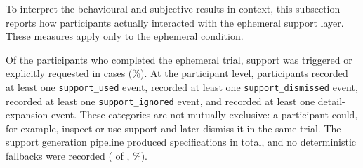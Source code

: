 %
%

To interpret the behavioural and subjective results in context, this subsection reports how participants actually interacted with the ephemeral support layer. These measures apply only to the ephemeral condition.

Of the \GenNValid{} participants who completed the ephemeral trial, support was triggered or explicitly requested in \GenEngNTriggered{} cases (\GenEngPctTriggered{}\%). At the participant level, \GenEngNUsed{} participants recorded at least one \texttt{support\_used} event, \GenEngNDismissed{} recorded at least one \texttt{support\_dismissed} event, \GenEngNIgnored{} recorded at least one \texttt{support\_ignored} event, and \GenEngNExpanded{} recorded at least one detail-expansion event. These categories are not mutually exclusive: a participant could, for example, inspect or use support and later dismiss it in the same trial. The support generation pipeline produced \GenEngTotalGen{} specifications in total, and no deterministic fallbacks were recorded (\GenEngFallbackCount{} of \GenEngTotalGen{}, \GenEngFallbackPct{}\%).

